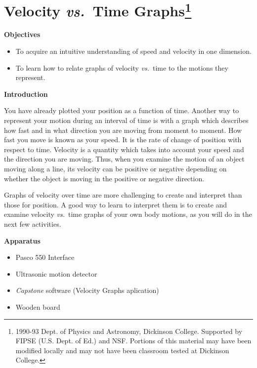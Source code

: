 
\section{Velocity \textit{vs.}~Time Graphs\footnote{
1990-93 Dept. of Physics and Astronomy, Dickinson College. Supported by FIPSE
(U.S. Dept. of Ed.) and NSF. Portions of this material may have been modified
locally and may not have been classroom tested at Dickinson College.
}}

\makelabheader %

\textbf{Objectives }

\begin{itemize}
\item To acquire an intuitive understanding of speed and velocity in one dimension. 
\item To learn how to relate graphs of velocity \textit{vs.}~time to the motions they represent.
\end{itemize}
\textbf{Introduction} 

You have already plotted your position as a function of time. Another way to
represent your motion during an interval of time is with a graph which describes
how fast and in what direction you are moving from moment to moment. How fast
you move is known as your speed. It is the rate of change of position with respect
to time. Velocity is a quantity which takes into account your speed and the
direction you are moving. Thus, when you examine the motion of an object moving
along a line, its velocity can be positive or negative depending
on whether the object is moving in the positive or negative direction.

Graphs of velocity over time are more challenging to create and interpret than
those for position. A good way to learn to interpret them is to create and examine velocity \textit{vs.}~time graphs of your own body motions, as you will do in the next few activities.

\medskip
\textbf{Apparatus}

\begin{itemize}
\item Pasco 550 Interface
\item Ultrasonic motion detector
\item \textit{Capstone} software (Velocity Graphs aplication)
\item Wooden board
\end{itemize}

